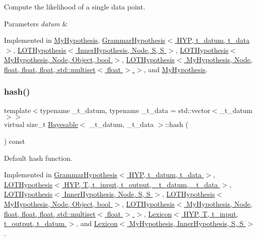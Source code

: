 Compute the likelihood of a single data point. 


\begin{DoxyParams}{Parameters}
{\em datum} & \\
\hline
\end{DoxyParams}


Implemented in \hyperlink{class_my_hypothesis_af60601a7db23e9ed8d1e3343af506733}{My\+Hypothesis}, \hyperlink{class_grammar_hypothesis_a848ed67089c24b55cc61a4d84e350d05}{Grammar\+Hypothesis$<$ H\+Y\+P, t\+\_\+datum, t\+\_\+data $>$}, \hyperlink{class_l_o_t_hypothesis_a835f1aafdd4bc4748c343edb80517956}{L\+O\+T\+Hypothesis$<$ Inner\+Hypothesis, Node, S, S $>$}, \hyperlink{class_l_o_t_hypothesis_a835f1aafdd4bc4748c343edb80517956}{L\+O\+T\+Hypothesis$<$ My\+Hypothesis, Node, Object, bool $>$}, \hyperlink{class_l_o_t_hypothesis_a835f1aafdd4bc4748c343edb80517956}{L\+O\+T\+Hypothesis$<$ My\+Hypothesis, Node, float, float, float, std\+::multiset$<$ float $>$ $>$}, and \hyperlink{class_my_hypothesis_a5e6bd5e0ebcb987aa4f0adf4295dba11}{My\+Hypothesis}.

\mbox{\label{class_bayesable_ab77a023d33951448e6edb2e1bc79c5ae}} 
\subsubsection{\texorpdfstring{hash()}{hash()}}
{\footnotesize\ttfamily template$<$typename \+\_\+t\+\_\+datum, typename \+\_\+t\+\_\+data = std\+::vector$<$\+\_\+t\+\_\+datum$>$$>$ \\
virtual size\+\_\+t \hyperlink{class_bayesable}{Bayesable}$<$ \+\_\+t\+\_\+datum, \+\_\+t\+\_\+data $>$\+::hash (\begin{DoxyParamCaption}{ }\end{DoxyParamCaption}) const\hspace{0.3cm}{\ttfamily [pure virtual]}}



Default hash function. 



Implemented in \hyperlink{class_grammar_hypothesis_a5b269a5ed433b94f6b2796f30a15fd9e}{Grammar\+Hypothesis$<$ H\+Y\+P, t\+\_\+datum, t\+\_\+data $>$}, \hyperlink{class_l_o_t_hypothesis_aa6859da0a3b422c32b1be2ffa025631a}{L\+O\+T\+Hypothesis$<$ H\+Y\+P, T, t\+\_\+input, t\+\_\+output, \+\_\+t\+\_\+datum, \+\_\+t\+\_\+data $>$}, \hyperlink{class_l_o_t_hypothesis_aa6859da0a3b422c32b1be2ffa025631a}{L\+O\+T\+Hypothesis$<$ Inner\+Hypothesis, Node, S, S $>$}, \hyperlink{class_l_o_t_hypothesis_aa6859da0a3b422c32b1be2ffa025631a}{L\+O\+T\+Hypothesis$<$ My\+Hypothesis, Node, Object, bool $>$}, \hyperlink{class_l_o_t_hypothesis_aa6859da0a3b422c32b1be2ffa025631a}{L\+O\+T\+Hypothesis$<$ My\+Hypothesis, Node, float, float, float, std\+::multiset$<$ float $>$ $>$}, \hyperlink{class_lexicon_ab3180c29ad8ec74de2a89ce109226047}{Lexicon$<$ H\+Y\+P, T, t\+\_\+input, t\+\_\+output, t\+\_\+datum $>$}, and \hyperlink{class_lexicon_ab3180c29ad8ec74de2a89ce109226047}{Lexicon$<$ My\+Hypothesis, Inner\+Hypothesis, S, S $>$}.


